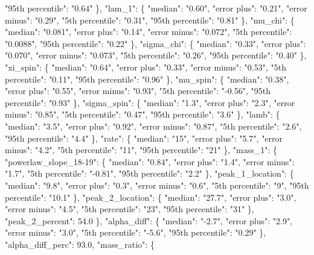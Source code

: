 {{        "95th percentile": "0.64"%
      \}, %
      "lam\_1": \{%
        "median": "0.60", %
        "error plus": "0.21", %
        "error minus": "0.29", %
        "5th percentile": "0.31", %
        "95th percentile": "0.81"%
      \}, %
      "mu\_chi": \{%
        "median": "0.081", %
        "error plus": "0.14", %
        "error minus": "0.072", %
        "5th percentile": "0.0088", %
        "95th percentile": "0.22"%
      \}, %
      "sigma\_chi": \{%
        "median": "0.33", %
        "error plus": "0.070", %
        "error minus": "0.073", %
        "5th percentile": "0.26", %
        "95th percentile": "0.40"%
      \}, %
      "xi\_spin": \{%
        "median": "0.64", %
        "error plus": "0.33", %
        "error minus": "0.53", %
        "5th percentile": "0.11", %
        "95th percentile": "0.96"%
      \}, %
      "mu\_spin": \{%
        "median": "0.38", %
        "error plus": "0.55", %
        "error minus": "0.93", %
        "5th percentile": "{-}0.56", %
        "95th percentile": "0.93"%
      \}, %
      "sigma\_spin": \{%
        "median": "1.3", %
        "error plus": "2.3", %
        "error minus": "0.85", %
        "5th percentile": "0.47", %
        "95th percentile": "3.6"%
      \}, %
      "lamb": \{%
        "median": "3.5", %
        "error plus": "0.92", %
        "error minus": "0.87", %
        "5th percentile": "2.6", %
        "95th percentile": "4.4"%
      \}, %
      "rate": \{%
        "median": "15", %
        "error plus": "5.7", %
        "error minus": "4.2", %
        "5th percentile": "11", %
        "95th percentile": "21"%
      \}, %
      "mass\_1": \{%
        "powerlaw\_slope\_18{-}19": \{%
          "median": "0.84", %
          "error plus": "1.4", %
          "error minus": "1.7", %
          "5th percentile": "{-}0.81", %
          "95th percentile": "2.2"%
        \}, %
        "peak\_1\_location": \{%
          "median": "9.8", %
          "error plus": "0.3", %
          "error minus": "0.6", %
          "5th percentile": "9", %
          "95th percentile": "10.1"%
        \}, %
        "peak\_2\_location": \{%
          "median": "27.7", %
          "error plus": "3.0", %
          "error minus": "4.5", %
          "5th percentile": "23", %
          "95th percentile": "31"%
        \}, %
        "peak\_2\_percent": 54.0%
      \}, %
      "alpha\_diff": \{%
        "median": "{-}2.7", %
        "error plus": "2.9", %
        "error minus": "3.0", %
        "5th percentile": "{-}5.6", %
        "95th percentile": "0.29"%
      \}, %
      "alpha\_diff\_perc": 93.0, %
      "mass\_ratio": \{%
}}
